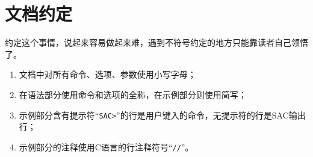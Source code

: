 \section{文档约定}
约定这个事情，说起来容易做起来难，遇到不符号约定的地方只能靠读者自己领悟了。
\begin{enumerate}
\item 文档中对所有命令、选项、参数使用小写字母；
\item 在语法部分使用命令和选项的全称，在示例部分则使用简写；
\item 示例部分含有提示符``\lstinline{SAC>}''的行是用户键入的命令，无提示符的行是SAC输出行；
\item 示例部分的注释使用C语言的行注释符号``\lstinline{//}''。
\end{enumerate}
